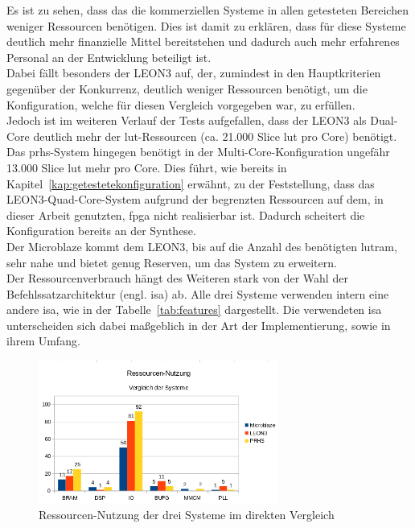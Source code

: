 Es ist zu sehen, dass das die kommerziellen Systeme in allen getesteten Bereichen weniger Ressourcen benötigen.
Dies ist damit zu erklären, dass für diese Systeme deutlich mehr finanzielle Mittel bereitstehen und dadurch auch mehr
erfahrenes Personal an der Entwicklung beteiligt ist.\\
Dabei fällt besonders der LEON3 auf, der, zumindest in den Hauptkriterien gegenüber der Konkurrenz, deutlich weniger Ressourcen
benötigt, um die Konfiguration, welche für diesen Vergleich vorgegeben war, zu erfüllen.\\
Jedoch ist im weiteren Verlauf der Tests aufgefallen, dass der LEON3 als Dual-Core deutlich mehr
 der \ac{lut}-Ressourcen (ca. 21.000 Slice \ac{lut} pro Core) benötigt. Das \ac{prhs}-System hingegen benötigt in der Multi-Core-Konfiguration ungefähr 13.000 Slice \ac{lut} mehr pro Core.
Dies führt, wie bereits in Kapitel~\ref{kap:getestetekonfiguration} erwähnt,
zu der Feststellung, dass das LEON3-Quad-Core-System aufgrund der begrenzten Ressourcen auf dem, in dieser Arbeit genutzten, \ac{fpga} nicht realisierbar ist.
\newpage
 Dadurch scheitert die Konfiguration bereits an der Synthese.\\
 Der Microblaze kommt dem LEON3, bis auf die Anzahl des benötigten \ac{lutram}, sehr nahe und bietet genug Reserven, um das System zu erweitern.\\
Der Ressourcenverbrauch hängt des Weiteren stark von der Wahl der Befehlssatzarchitektur (engl. \ac{isa}) ab. Alle drei Systeme verwenden intern eine andere \ac{isa}, wie in der
Tabelle~\ref{tab:features} dargestellt. Die verwendeten \ac{isa} unterscheiden sich dabei maßgeblich in der Art der Implementierung, sowie in ihrem Umfang.\\
\begin{figure}[H]
\centering
\includegraphics[width=0.7\textwidth]{Hauptteil/ressourcenresult1.png}
\caption{Ressourcen-Nutzung der drei Systeme im direkten Vergleich}
\label{fig:ressourcenresult1}
\end{figure}

